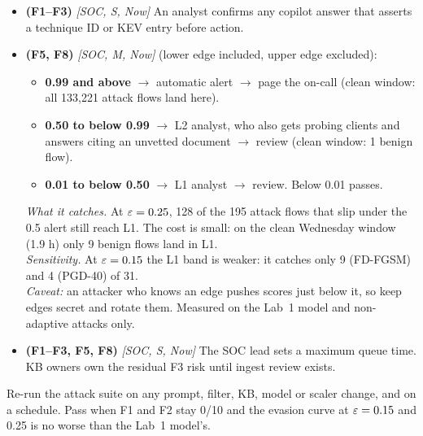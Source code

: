 \begin{itemize}
\item \textbf{(F1--F3)} \emph{[SOC, S, Now]} An analyst confirms any copilot answer that asserts a technique ID or KEV entry before action.
\item \textbf{(F5, F8)} \emph{[SOC, M, Now]}  (lower edge included, upper edge excluded):
\begin{itemize}\setlength\itemsep{0pt}
\item \textbf{0.99 and above} $\rightarrow$ automatic alert $\rightarrow$ page the on-call (clean window: all 133{,}221 attack flows land here).
\item \textbf{0.50 to below 0.99} $\rightarrow$ L2 analyst, who also gets probing clients and answers citing an unvetted document $\rightarrow$ review (clean window: 1 benign flow).
\item \textbf{0.01 to below 0.50} $\rightarrow$ L1 analyst $\rightarrow$ review. Below 0.01 passes.
\end{itemize}
\emph{What it catches.} At $\varepsilon=0.25$, 128 of the 195 attack flows that slip under the 0.5 alert still reach L1. The cost is small: on the clean Wednesday window (1.9 h) only 9 benign flows land in L1.\\
\emph{Sensitivity.} At $\varepsilon=0.15$ the L1 band is weaker: it catches only 9 (FD-FGSM) and 4 (PGD-40) of 31.\\
\emph{Caveat:} an attacker who knows an edge pushes scores just below it, so keep edges secret and rotate them. Measured on the Lab~1 model and non-adaptive attacks only.
\item \textbf{(F1--F3, F5, F8)} \emph{[SOC, S, Now]}  The SOC lead sets a maximum queue time. KB owners own the residual F3 risk until ingest review exists.
\end{itemize}

 Re-run the attack suite on any prompt, filter, KB, model or scaler change, and on a schedule. Pass when F1 and F2 stay 0/10 and the evasion curve at $\varepsilon=0.15$ and 0.25 is no worse than the Lab~1 model's.
